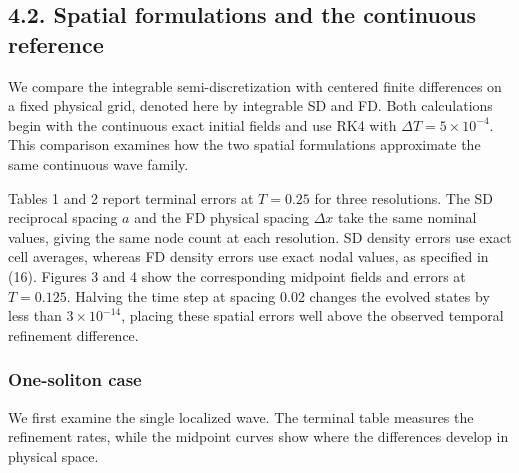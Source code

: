 \documentclass[11pt,a4paper]{article}
\begin{document}
\FloatBarrier
\subsection*{4.2. Spatial formulations and the continuous reference}

We compare the integrable semi-discretization with centered finite differences on a fixed physical grid, denoted here by integrable SD and FD. Both calculations begin with the continuous exact initial fields and use RK4 with \(\Delta T=5\times10^{-4}\). This comparison examines how the two spatial formulations approximate the same continuous wave family.

Tables 1 and 2 report terminal errors at \(T=0.25\) for three resolutions. The SD reciprocal spacing \(a\) and the FD physical spacing \(\Delta x\) take the same nominal values, giving the same node count at each resolution. SD density errors use exact cell averages, whereas FD density errors use exact nodal values, as specified in (16). Figures 3 and 4 show the corresponding midpoint fields and errors at \(T=0.125\). Halving the time step at spacing 0.02 changes the evolved states by less than \(3\times10^{-14}\), placing these spatial errors well above the observed temporal refinement difference.

\subsubsection*{One-soliton case}

We first examine the single localized wave. The terminal table measures the refinement rates, while the midpoint curves show where the differences develop in physical space.
\end{document}
